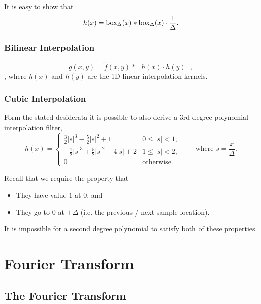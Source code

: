 It is easy to show that \[
    h(x) = \mathrm{box}_{\Delta}(x) \ast \mathrm{box}_{\Delta}(x) \cdot \frac{1}{\Delta}.
\]

\subsubsection{Bilinear Interpolation}


\[
    g(x, y) = \tilde{f}(x, y) \ast \left[ h(x) \cdot h(y) \right],
\], where $h(x)$ and $h(y)$ are the 1D linear interpolation kernels.

\subsubsection{Cubic Interpolation}

Form the stated desiderata it is possible to also derive a 3rd degree polynomial interpolation filter, \[
    h(x) = \begin{cases}
        \frac{3}{2} |s|^3 - \frac{5}{2} |s|^2 + 1 & 0 \le |s| < 1, \\
        -\frac{1}{2} |s|^3 + \frac{5}{2} |s|^2 - 4|s| + 2 & 1 \le |s| < 2, \\
        0 & \text{otherwise}.
    \end{cases} \qquad \text{where } s = \frac{x}{\Delta}.
\]

\begin{remark}
    Recall that we require the property that \begin{itemize}
        \item They have value $1$ at $0$, and 
        \item They go to $0$ at $\pm \Delta$ (i.e. the previous / next sample location).
    \end{itemize}

    It is impossible for a second degree polynomial to satisfy both of these properties.
\end{remark}

\section{Fourier Transform}

\subsection{The Fourier Transform}

